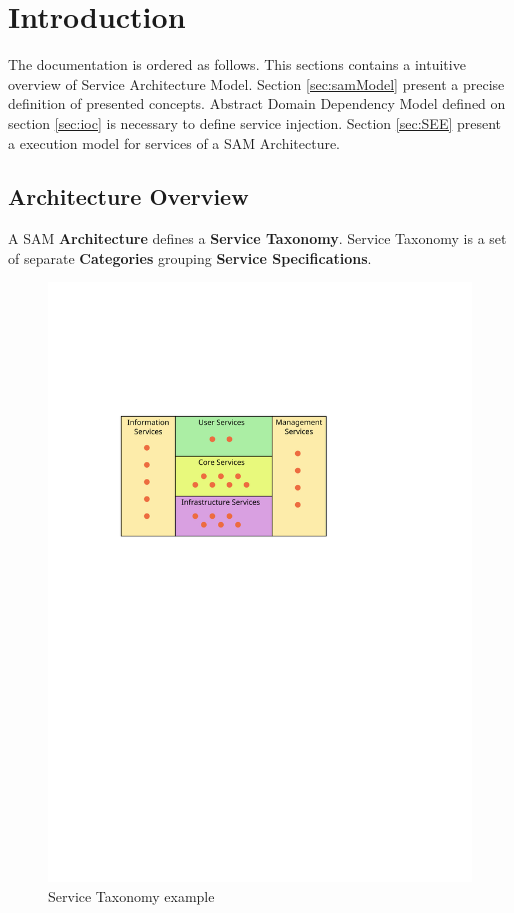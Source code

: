 \section{Introduction}



The documentation is ordered as follows. This sections contains a intuitive overview of Service Architecture Model. Section \ref{sec:samModel} present a precise definition of presented concepts. Abstract Domain Dependency Model defined on section \ref{sec:ioc} is necessary to define service injection. Section \ref{sec:SEE} present a execution model for services of a SAM Architecture.

\subsection{Architecture Overview}

A SAM \textbf{Architecture} defines a \textbf{Service Taxonomy}. Service Taxonomy is a set of separate \textbf{Categories} grouping \textbf{Service Specifications}.

\begin{figure}[h!]
 \centering
 \includegraphics[width=1\textwidth]{taxonomy}
 \caption{Service Taxonomy example}
 \label{fig:taxonomy}
\end{figure}

